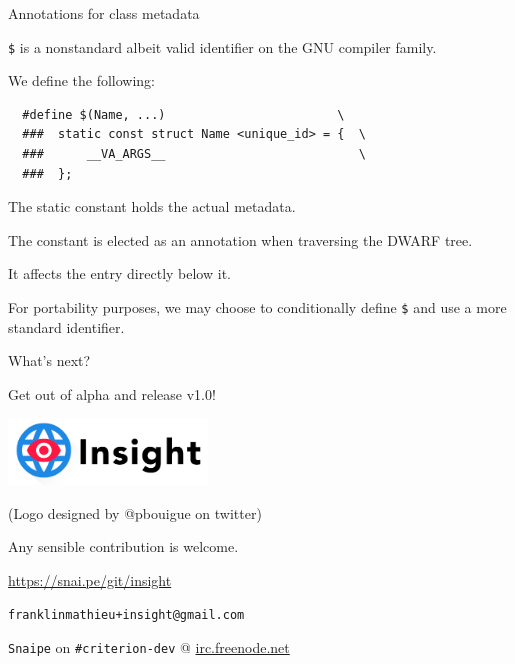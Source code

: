 \documentclass[10pt]{beamer}
\begin{document}
\begin{frame}[fragile]{Annotations for class metadata}

  \verb|$| is a nonstandard albeit valid identifier on the GNU compiler family.

  \pause{}

  We define the following:

  \begin{lstlisting}
  #define $(Name, ...)                        \
  ###  static const struct Name <unique_id> = {  \
  ###      __VA_ARGS__                           \
  ###  };
  \end{lstlisting}

  \pause{}

  The static constant holds the actual metadata.

  \pause{}

  The constant is elected as an annotation when traversing the DWARF tree.

  It affects the entry directly below it.

  \pause{}

  For portability purposes, we may choose to conditionally define \verb|$| and
  use a more standard identifier.
\end{frame}


\begin{frame}[fragile]{What's next?}

  \begin{center}
    \large Get out of alpha and release v1.0! \normalsize

    \includegraphics[height=50pt]{insight.png}

    \small (Logo designed by @pbouigue on twitter) \normalsize

    Any sensible contribution is welcome.

    \large \faGithub \normalsize\hspace{0.7em}
    \url{https://snai.pe/git/insight}

    \large \faEnvelope \normalsize\hspace{0.7em}
    \verb|franklinmathieu+insight@gmail.com|

    \verb|Snaipe| on \verb|#criterion-dev| @ \url{irc.freenode.net}

  \end{center}
\end{frame}

\end{document}
